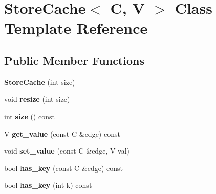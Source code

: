 \hypertarget{class_store_cache}{
\section{StoreCache$<$ C, V $>$ Class Template Reference}
\label{class_store_cache}
}
\subsection*{Public Member Functions}
\begin{DoxyCompactItemize}
\item 
\hypertarget{class_store_cache_adeb02113caf8141430705ec5bab08a54}{
{\bfseries StoreCache} (int size)}
\label{class_store_cache_adeb02113caf8141430705ec5bab08a54}

\item 
\hypertarget{class_store_cache_a5aaafba803337cf3547159a6ac70a0ab}{
void {\bfseries resize} (int size)}
\label{class_store_cache_a5aaafba803337cf3547159a6ac70a0ab}

\item 
\hypertarget{class_store_cache_aa4673d48544458b6b05770fe5970d961}{
int {\bfseries size} () const }
\label{class_store_cache_aa4673d48544458b6b05770fe5970d961}

\item 
\hypertarget{class_store_cache_a455dbf75e40300745b354fdcc039279a}{
V {\bfseries get\_\-value} (const C \&edge) const }
\label{class_store_cache_a455dbf75e40300745b354fdcc039279a}

\item 
\hypertarget{class_store_cache_a23309f685f0ba18912dcc2e8643de932}{
void {\bfseries set\_\-value} (const C \&edge, V val)}
\label{class_store_cache_a23309f685f0ba18912dcc2e8643de932}

\item 
\hypertarget{class_store_cache_aa1289fedb472667dfa926c1e00f22b95}{
bool {\bfseries has\_\-key} (const C \&edge) const }
\label{class_store_cache_aa1289fedb472667dfa926c1e00f22b95}

\item 
\hypertarget{class_store_cache_ad358ce23080bb52db50a55db583f1bba}{
bool {\bfseries has\_\-key} (int k) const }
\label{class_store_cache_ad358ce23080bb52db50a55db583f1bba}

\end{DoxyCompactItemize}
